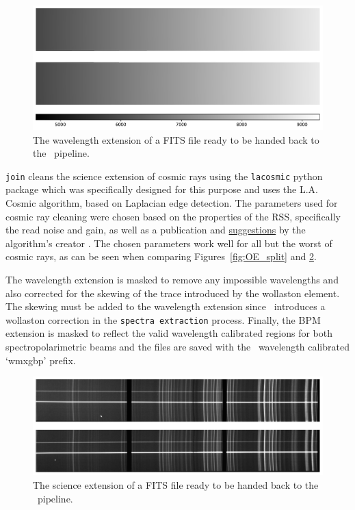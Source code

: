 \begin{figure}[t]
    \centering
    \includegraphics[width = 1.0\textwidth]{figures/3_pol_wav_ext.pdf}
    \caption{The wavelength extension of a \gls{FITS} file ready to be handed back to the \polsalt\ pipeline.}
    \label{fig:pol_wav_ext}
\end{figure}

\texttt{join} cleans the science extension of cosmic rays using the \texttt{lacosmic} python package which was specifically designed for this purpose and uses the L.A. Cosmic algorithm, based on Laplacian edge detection. The parameters used for cosmic ray cleaning were chosen based on the properties of the \gls{RSS}, specifically the read noise and gain, as well as a publication and \hyperlink{http://www.astro.yale.edu/dokkum/lacosmic/pars.html}{suggestions} by the algorithm's creator \citep{lacosmic}. The chosen parameters work well for all but the worst of cosmic rays, as can be seen when comparing Figures~\ref{fig:OE_split} and \ref{fig:polsalt_post_wav_cal}.

The wavelength extension is masked to remove any impossible wavelengths and also corrected for the skewing of the trace introduced by the wollaston element. The skewing must be added to the wavelength extension since \polsalt\ introduces a wollaston correction in the \texttt{spectra extraction} process. Finally, the \gls{BPM} extension is masked to reflect the valid wavelength calibrated regions for both spectropolarimetric beams and the files are saved with the \polsalt\ wavelength calibrated `wmxgbp' prefix.

\begin{figure}[t]
    \centering
    \includegraphics[width = 1.0\textwidth]{figures/3_post_wav_cal.pdf}
    \caption{The science extension of a \gls{FITS} file ready to be handed back to the \polsalt\ pipeline.}
    \label{fig:polsalt_post_wav_cal}
\end{figure}

